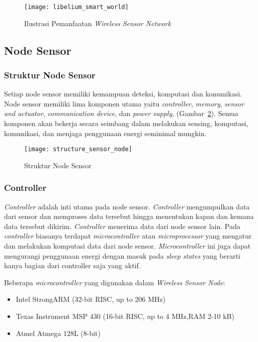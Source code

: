 \begin{figure} [H]
	\centering  
	\texttt{[image: libelium\_smart\_world]}  
	\caption[Ilustrasi Pemanfaatan \textit{Wireless Sensor Network}]{Ilustrasi Pemanfaatan \textit{Wireless Sensor Network}} 
	\label{fig:smartworld} 
\end{figure} 

\subsection{Node Sensor}
\subsubsection{Struktur Node Sensor}
Setiap node sensor memiliki kemampuan deteksi, komputasi dan komunikasi. Node sensor memiliki lima komponen utama yaitu \textit{controller}, \textit{memory}, \textit{sensor and actuator}, \textit{communication device}, dan \textit{power supply}, (Gambar~\ref{fig:structure_sensor_node}). Semua komponen akan bekerja secara seimbang dalam melakukan sensing, komputasi, komunikasi, dan menjaga penggunaan energi seminimal mungkin. 

\begin{figure} [H]
	\centering  
	\texttt{[image: structure\_sensor\_node]}  
	\caption[Struktur Node Sensor]{Struktur Node Sensor} 
	\label{fig:structure_sensor_node} 
\end{figure} 

\subsubsection{Controller}
\textit{Controller} adalah inti utama pada node sensor. \textit{Controller} mengumpulkan data dari sensor dan memproses data tersebut hingga menentukan kapan dan kemana data tersebut dikirim. \textit{Controller} menerima data dari node sensor lain. Pada \textit{controller} biasanya terdapat \textit{microcontroller} atau \textit{microprocessor} yang mengatur dan melakukan komputasi data dari node sensor. \textit{Microcontroller} ini juga dapat mengurangi penggunaan energi dengan masuk pada \textit{sleep states} yang berarti hanya bagian dari controller saja yang aktif.

Beberapa \textit{microcontroller} yang digunakan dalam \textit{Wireless Sensor Node}:
\begin{itemize}
	\item Intel StrongARM (32-bit RISC, up to 206 MHz)
	\item Texas Instrument MSP 430 (16-bit RISC, up to 4 MHz,RAM 2-10 kB)
	\item Atmel Atmega 128L (8-bit)
\end{itemize}

